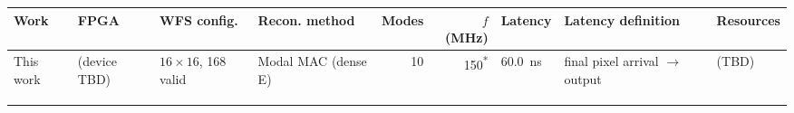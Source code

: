%
%
%
\begin{tabular}{llllrrlll}
\hline
Work & FPGA & WFS config. & Recon. method & Modes & $f$ (MHz) &
Latency & Latency definition & Resources \\
\hline
This work & (device TBD) & $16\times16$, 168 valid & Modal MAC (dense E) & 10 &
150\textsuperscript{*} & 60.0~ns & final pixel arrival $\rightarrow$ output &
(TBD) \\
\hline
 &  &  &  &  &  &  &  &  \\
 &  &  &  &  &  &  &  &  \\
 &  &  &  &  &  &  &  &  \\
\hline
\end{tabular}

